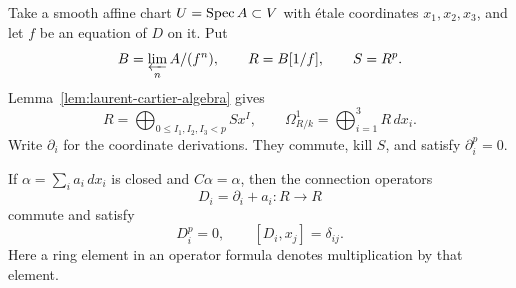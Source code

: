 Take a smooth affine chart \(U=\operatorname{Spec} A\subset V\) with
\'etale coordinates \(x_1,x_2,x_3\), and let \(f\) be an
equation of \(D\) on it.  Put
\[
 B=\varprojlim_n A/(f^n),\qquad R=B[1/f],\qquad S=R^p.
\]
Lemma~\ref{lem:laurent-cartier-algebra} gives
\begin{equation}
 R=\bigoplus_{0\le I_1,I_2,I_3<p}Sx^I,
 \qquad
 \Omega^1_{R/k}=\bigoplus_{i=1}^3R\,dx_i.
 \label{eq:cartier-pbasis}
\end{equation}
Write \(\partial_i\) for the coordinate derivations.  They
commute, kill \(S\), and satisfy \(\partial_i^p=0\).

\begin{lemma}
\label{lem:cartier-curvature}
If \(\alpha=\sum_i a_i\,dx_i\) is closed and
\(C\alpha=\alpha\), then the connection operators
\[
 D_i=\partial_i+a_i:R\longrightarrow R
\]
commute and satisfy
\begin{equation}
 D_i^p=0,
 \qquad [D_i,x_j]=\delta_{ij}.
 \label{eq:horizontal-relations}
\end{equation}
Here a ring element in an operator formula denotes multiplication
by that element.
\end{lemma}

